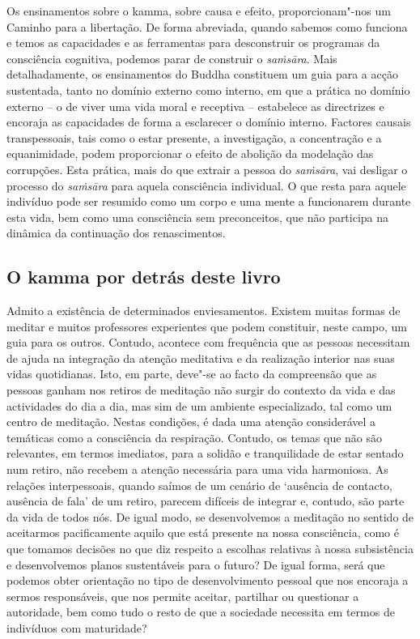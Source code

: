 Os ensinamentos sobre o kamma, sobre causa e efeito, proporcionam"-nos um Caminho
para a libertação. De forma abreviada, quando sabemos como funciona e temos as
capacidades e as ferramentas para desconstruir os programas da consciência
cognitiva, podemos parar de construir o \emph{saṁsāra}. Mais detalhadamente, os
ensinamentos do Buddha constituem um guia para a acção sustentada, tanto no
domínio externo como interno, em que a prática no domínio externo -- o de viver
uma vida moral e receptiva -- estabelece as directrizes e encoraja as
capacidades de forma a esclarecer o domínio interno. Factores causais
transpessoais, tais como o estar presente, a investigação, a concentração e a
equanimidade, podem proporcionar o efeito de abolição da modelação das
corrupções. Esta prática, mais do que extrair a pessoa do \emph{saṁsāra}, vai
desligar o processo do \emph{saṁsāra} para aquela consciência individual. O que
resta para aquele indivíduo pode ser resumido como um corpo e uma mente a
funcionarem durante esta vida, bem como uma consciência sem preconceitos, que
não participa na dinâmica da continuação dos renascimentos.

\subsection{O kamma por detrás deste livro}

Admito a existência de determinados enviesamentos. Existem muitas formas de
meditar e muitos professores experientes que podem constituir, neste campo, um
guia para os outros. Contudo, acontece com frequência que as pessoas necessitam
de ajuda na integração da atenção meditativa e da realização interior nas suas
vidas quotidianas. Isto, em parte, deve"-se ao facto da compreensão que as
pessoas ganham nos retiros de meditação não surgir do contexto da vida e das
actividades do dia a dia, mas sim de um ambiente especializado, tal como um
centro de meditação. Nestas condições, é dada uma atenção considerável a
temáticas como a consciência da respiração. Contudo, os temas que não são
relevantes, em termos imediatos, para a solidão e tranquilidade de estar sentado
num retiro, não recebem a atenção necessária para uma vida harmoniosa. As
relações interpessoais, quando saímos de um cenário de `ausência de contacto,
ausência de fala' de um retiro, parecem difíceis de integrar e, contudo, são
parte da vida de todos nós. De igual modo, se desenvolvemos a meditação no
sentido de aceitarmos pacificamente aquilo que está presente na nossa
consciência, como é que tomamos decisões no que diz respeito a escolhas
relativas à nossa subsistência e desenvolvemos planos sustentáveis para o
futuro? De igual forma, será que podemos obter orientação no tipo de
desenvolvimento pessoal que nos encoraja a sermos responsáveis, que nos permite
aceitar, partilhar ou questionar a autoridade, bem como tudo o resto de que a
sociedade necessita em termos de indivíduos com maturidade?

